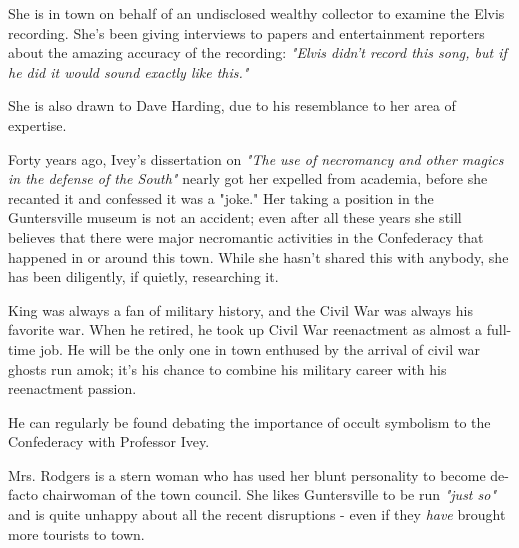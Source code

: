 \documentclass{motw}
\begin{document}


She is in town on behalf of an undisclosed wealthy collector to examine the Elvis recording.  She's been giving interviews to papers and entertainment reporters about the amazing accuracy of the recording: \emph{"Elvis didn't record this song, but if he did it would sound exactly like this."}

She is also drawn to Dave Harding, due to his resemblance to her area of expertise.


Forty years ago, Ivey's dissertation on \emph{"The use of necromancy and other magics in the defense of the South"} nearly got her expelled from academia, before she recanted it and confessed it was a "joke."  Her taking a position in the Guntersville museum is not an accident; even after all these years she still believes that there were major necromantic activities in the Confederacy that happened in or around this town.  While she hasn't shared this with anybody, she has been diligently, if quietly, researching it.


King was always a fan of military history, and the Civil War was always his favorite war.  When he retired, he took up Civil War reenactment as almost a full-time job.  He will be the only one in town enthused by the arrival of civil war ghosts run amok; it's his chance to combine his military career with his reenactment passion.

He can regularly be found debating the importance of occult symbolism to the Confederacy with Professor Ivey.


Mrs. Rodgers is a stern woman who has used her blunt personality to become de-facto chairwoman of the town council.  She likes Guntersville to be run \emph{"just so"} and is quite unhappy about all the recent disruptions - even if they \emph{have} brought more tourists to town.
\end{document}
